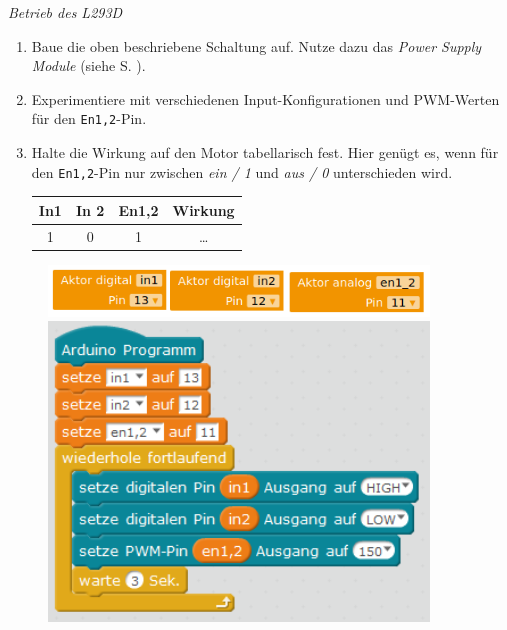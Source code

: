 \begin{aufgabe} \emph{Betrieb des L293D}
	
	\medskip
	\begin{minipage}{0.43\textwidth}
		\begin{enumerate}[label=\alph*), itemsep=0mm, parsep=0mm]
			\item Baue die oben beschriebene Schaltung auf. Nutze dazu das \emph{Power Supply Module} (siehe S. \pageref{powersupplymodule}).
			\item Experimentiere mit verschiedenen Input-Konfigurationen und PWM-Werten für den \texttt{En1,2}-Pin. 
			
			\item Halte die Wirkung auf den Motor tabellarisch fest. Hier genügt es, wenn für den \texttt{En1,2}-Pin nur zwischen \emph{ein / 1} und \emph{aus / 0} unterschieden wird.
			
			\begin{tabular}{c|c|c|c}
				In1 & In 2 & En1,2 & Wirkung \\ \hline
				1 & 0 & 1 & \dots \\
			\end{tabular}
		\end{enumerate}
	\end{minipage}
	\hfill
	\begin{minipage}{0.55\textwidth}
		\begin{figure}[H]
			\centering
			\includegraphics[width=0.9\textwidth]{./pics/prog-konfiguration-l293d.png}
			\includegraphics[width=0.9\textwidth]{./pics/prog-motorsteuerung-l293d.png}
		\end{figure}
	\end{minipage}
\end{aufgabe}

